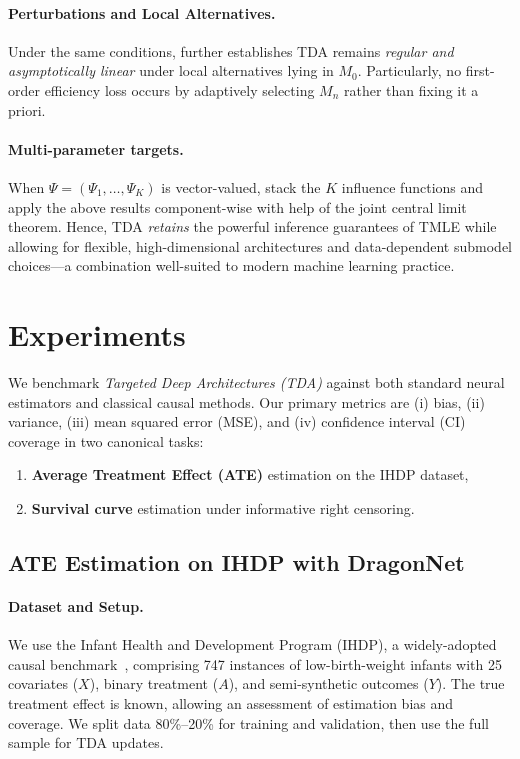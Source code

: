 \documentclass{article}
\theoremstyle{remark}
\begin{document}
\paragraph{Perturbations and Local Alternatives.}
Under the same conditions, \cite[Theorem 6,7]{van2023adaptive} further establishes TDA remains \emph{regular and asymptotically linear} under local alternatives lying in $M_0$.  Particularly, no first-order efficiency loss occurs by adaptively selecting $M_n$ rather than fixing it a priori.

\paragraph{Multi-parameter targets.}
When $\Psi=(\Psi_1,\dots,\Psi_K)$ is vector-valued, stack the $K$
influence functions and apply the above results component-wise with help of the joint central limit theorem. Hence, TDA \emph{retains} the powerful inference guarantees of TMLE while allowing for flexible, high-dimensional architectures and data-dependent submodel choices—a combination well-suited to modern machine learning practice.

\section{Experiments}
\label{sec:experiments}

We benchmark \emph{Targeted Deep Architectures (TDA)} against both standard neural estimators and classical causal methods. Our primary metrics are (i) bias, (ii) variance, (iii) mean squared error (MSE), and (iv) confidence interval (CI) coverage in two canonical tasks:
\begin{enumerate}[label=(\alph*)]
    \item \textbf{Average Treatment Effect (ATE)} estimation on the IHDP dataset,
    \item \textbf{Survival curve} estimation under informative right censoring.
\end{enumerate}

\subsection{ATE Estimation on IHDP with DragonNet}
\label{sec:ate_ihdp}

\paragraph{Dataset and Setup.}
We use the Infant Health and Development Program (IHDP), a widely-adopted causal benchmark~\cite{hill2011bayesian,shalit2017estimating,shi2019adapting}, comprising 747 instances of low-birth-weight infants with 25 covariates ($X$), binary treatment ($A$), and semi-synthetic outcomes ($Y$). The true treatment effect is known, allowing an assessment of estimation bias and coverage. We split data 80\%–20\% for training and validation, then use the full sample for TDA updates. 
\end{document}
